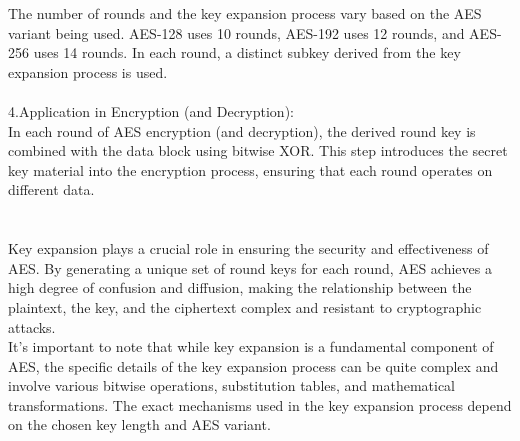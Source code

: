 \documentclass{report}
\begin{document}
The number of rounds and the key expansion process vary based on the AES variant being used. AES-128 uses 10 rounds, AES-192 uses 12 rounds, and AES-256 uses 14 rounds. In each round, a distinct subkey derived from the key expansion process is used.\\
\\
4.Application in Encryption (and Decryption):\\
In each round of AES encryption (and decryption), the derived round key is combined with the data block using bitwise XOR. This step introduces the secret key material into the encryption process, ensuring that each round operates on different data.\\
\\
\\
Key expansion plays a crucial role in ensuring the security and effectiveness of AES. By generating a unique set of round keys for each round, AES achieves a high degree of confusion and diffusion, making the relationship between the plaintext, the key, and the ciphertext complex and resistant to cryptographic attacks.\\
It's important to note that while key expansion is a fundamental component of AES, the specific details of the key expansion process can be quite complex and involve various bitwise operations, substitution tables, and mathematical transformations. The exact mechanisms used in the key expansion process depend on the chosen key length and AES variant.
\end{document}
